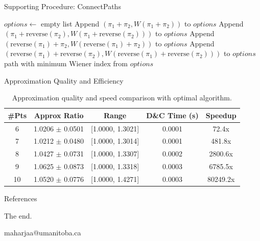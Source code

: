 \documentclass[11pt]{beamer}
\makeatletter
\newcommand{\email}{maharjaa@umanitoba.ca}
\makeatother
\begin{document}
\begin{frame}{Supporting Procedure: ConnectPaths}
	\begin{algorithm}[H]
		\caption{ConnectPaths($\pi_1$, $\pi_2$)}
		\begin{algorithmic}[1]
			\State $options \gets$ empty list
			\State Append $(\pi_1 + \pi_2, W(\pi_1 + \pi_2))$ to $options$
			\State Append $(\pi_1 + \text{reverse}(\pi_2), W(\pi_1 + \text{reverse}(\pi_2)))$ to $options$
			\State Append $(\text{reverse}(\pi_1) + \pi_2, W(\text{reverse}(\pi_1) + \pi_2))$ to $options$
			\State Append $(\text{reverse}(\pi_1) + \text{reverse}(\pi_2), W(\text{reverse}(\pi_1) + \text{reverse}(\pi_2)))$ to $options$
			\State \Return path with minimum Wiener index from $options$
			\EndProcedure
		\end{algorithmic}
	\end{algorithm}
\end{frame}

\begin{frame}{Approximation Quality and Efficiency}
	\scriptsize
	\begin{table}[htbp]
		\centering
		\begin{tabular}{|c|c|c|c|c|}
			\hline
			\textbf{\#Pts} & \textbf{Approx Ratio} & \textbf{Range}   & \textbf{D\&C Time (s)} & \textbf{Speedup} \\
			\hline
			6              & 1.0206 $\pm$ 0.0501   & [1.0000, 1.3021] & 0.0001                 & 72.4x            \\
			7              & 1.0212 $\pm$ 0.0480   & [1.0000, 1.3014] & 0.0001                 & 481.8x           \\
			8              & 1.0427 $\pm$ 0.0731   & [1.0000, 1.3307] & 0.0002                 & 2800.6x          \\
			9              & 1.0625 $\pm$ 0.0873   & [1.0000, 1.3318] & 0.0003                 & 6785.5x          \\
			10             & 1.0520 $\pm$ 0.0776   & [1.0000, 1.4271] & 0.0003                 & 80249.2x         \\
			\hline
		\end{tabular}
		\caption{Approximation quality and speed comparison with optimal algorithm.}
	\end{table}
\end{frame}

\begin{frame}[allowframebreaks]{References}
	
\end{frame}

\begin{frame}
	\begin{center}
		The end.

		\email
	\end{center}
\end{frame}
\end{document}
